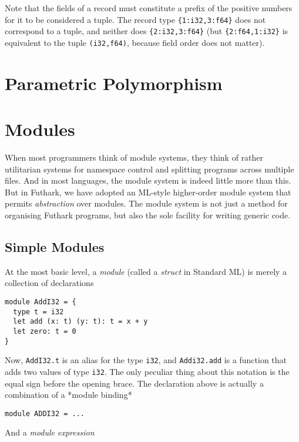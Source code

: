 \documentclass[oneside,11pt]{book}
\begin{document}
Note that the fields of a record must constitute a prefix of the
positive numbers for it to be considered a tuple.  The record type
\lstinline!{1:i32,3:f64}! does not correspond to a tuple, and neither
does \lstinline!{2:i32,3:f64}! (but \lstinline!{2:f64,1:i32}!  is
equivalent to the tuple \lstinline{(i32,f64)}, because field order
does not matter).

\section{Parametric Polymorphism}
\label{sec:polymorphism}

\section{Modules}
\label{sec:modules}

When most programmers think of module systems, they think of rather
utilitarian systems for namespace control and splitting programs
across multiple files.  And in most languages, the module system is
indeed little more than this.  But in Futhark, we have adopted an
ML-style higher-order module system that permits \textit{abstraction}
over modules.  The module system is not just a method for organising
Futhark programs, but also the sole facility for writing generic code.

\subsection{Simple Modules}

At the most basic level, a \textit{module} (called a \textit{struct}
in Standard ML) is merely a collection of declarations

\begin{lstlisting}
module AddI32 = {
  type t = i32
  let add (x: t) (y: t): t = x + y
  let zero: t = 0
}
\end{lstlisting}

Now, \texttt{AddI32.t} is an alias for the type \texttt{i32}, and
\texttt{Addi32.add} is a function that adds two values of type
\texttt{i32}.  The only peculiar thing about this notation is the
equal sign before the opening brace.  The declaration above is
actually a combination of a *module binding*

\begin{lstlisting}
module ADDI32 = ...
\end{lstlisting}

And a \textit{module expression}
\end{document}

